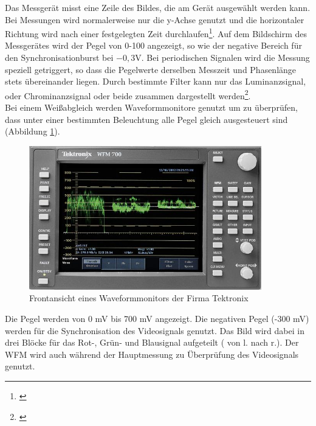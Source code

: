 \noindent Das Messgerät misst eine Zeile des Bildes, die am Gerät ausgewählt werden kann. Bei Messungen wird normalerweise nur die y-Achse genutzt und die horizontaler Richtung wird nach einer festgelegten Zeit durchlaufen\footnote{\cite[110]{schmidt}}. Auf dem Bildschirm des Messgerätes wird der Pegel von 0-100 angezeigt, so wie der negative Bereich für den Synchronisationburst bei $-0,3$V. Bei periodischen Signalen wird die Messung speziell getriggert, so dass die Pegelwerte derselben Messzeit und Phasenlänge stets übereinander liegen. Durch bestimmte Filter kann nur das Luminanzsignal, oder Chrominanzsignal oder beide zusammen dargestellt werden\footnote{\cite[111]{schmidt}}.\\
\noindent Bei einem Weißabgleich werden Waveformmonitore genutzt um zu überprüfen, dass unter einer bestimmten Beleuchtung alle Pegel gleich ausgesteuert sind (Abbildung \ref{b_wmf}).

\begin{figure}[H]     %
\centering
\includegraphics[width=0.9\textwidth]{bilder/wmf} 
\caption {Frontansicht eines Waveformmonitors der Firma Tektronix\protect\footnotemark}\label{b_wmf}
\end{figure}

\noindent Die Pegel werden von 0 mV bis 700 mV angezeigt. Die negativen Pegel (-300 mV) werden für die Synchronisation des Videosignals genutzt. Das Bild wird dabei in drei Blöcke für das Rot-, Grün- und Blausignal aufgeteilt ( von l. nach r.). Der WFM wird auch während der Hauptmessung zu Überprüfung des Videosignals genutzt.

